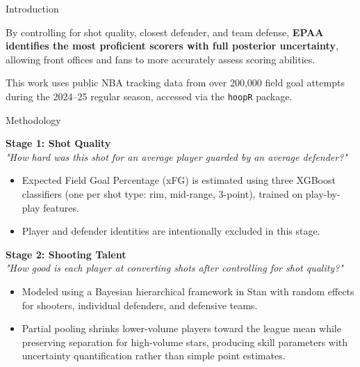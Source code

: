 \documentclass[final]{beamer}
\newlength{\onecolwid}
\begin{document}
\begin{frame}[t]
\begin{columns}[t,totalwidth=\textwidth]
\begin{column}{\onecolwid}
\begin{alertblock}{Introduction}
\vspace{2ex}

By controlling for shot quality, closest defender, and team defense, \textbf{EPAA identifies the most proficient scorers with full posterior uncertainty}, allowing front offices and fans to more accurately assess scoring abilities. 

\vspace{2ex}

This work uses public NBA tracking data from over 200,000 field goal attempts during the 2024–25 regular season, accessed via the \texttt{hoopR} package.

\end{alertblock}






\begin{block}{Methodology}

\textbf{Stage 1: Shot Quality} \\[0.5ex]
\textit{"How hard was this shot for an average player guarded by an average defender?"}
\vspace{0.5ex}
\begin{itemize}
\item Expected Field Goal Percentage (xFG) is estimated using three XGBoost classifiers (one per shot type: rim, mid-range, 3-point), trained on play-by-play features.
\item Player and defender identities are intentionally excluded in this stage.
\end{itemize}

\vspace{2ex}

\textbf{Stage 2: Shooting Talent} \\[0.5ex]
\textit{"How good is each player at converting shots after controlling for shot quality?"}
\vspace{0.5ex}
\begin{itemize}
\item Modeled using a Bayesian hierarchical framework in Stan with random effects for shooters, individual defenders, and defensive teams.
\item Partial pooling shrinks lower-volume players toward the league mean while preserving separation for high-volume stars, producing skill parameters with uncertainty quantification rather than simple point estimates.
\end{itemize}





\end{block}
\end{column}
\end{columns}
\end{frame}
\end{document}
